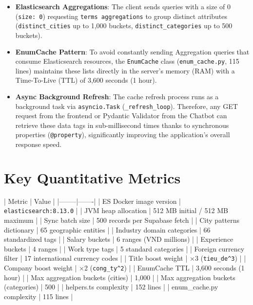 \begin{itemize}
\item \textbf{Elasticsearch Aggregations}: The client sends queries with a size of 0 (\texttt{size: 0}) requesting \texttt{terms aggregations} to group distinct attributes (\texttt{distinct\_cities} up to 1,000 buckets, \texttt{distinct\_categories} up to 500 buckets).
\item \textbf{EnumCache Pattern}: To avoid constantly sending Aggregation queries that consume Elasticsearch resources, the \texttt{EnumCache} class (\texttt{enum\_cache.py}, 115 lines) maintains these lists directly in the server's memory (RAM) with a Time-To-Live (TTL) of 3,600 seconds (1 hour).
\item \textbf{Async Background Refresh}: The cache refresh process runs as a background task via \texttt{asyncio.Task} (\texttt{\_refresh\_loop}). Therefore, any GET request from the frontend or Pydantic Validator from the Chatbot can retrieve these data tags in sub-millisecond times thanks to synchronous properties (\texttt{@property}), significantly improving the application's overall response speed.
\end{itemize}

\section{Key Quantitative Metrics}

| Metric | Value |
|--------|-------|
| ES Docker image version | \texttt{elasticsearch:8.13.0} |
| JVM heap allocation | 512 MB initial / 512 MB maximum |
| Sync batch size | 500 records per Supabase fetch |
| City patterns dictionary | 65 geographic entities |
| Industry domain categories | 66 standardized tags |
| Salary buckets | 6 ranges (VND millions) |
| Experience buckets | 4 ranges |
| Work type tags | 5 standard categories |
| Foreign currency filter | 17 international currency codes |
| Title boost weight | ×3 (\texttt{tieu\_de\textasciicircum{}3}) |
| Company boost weight | ×2 (\texttt{cong\_ty\textasciicircum{}2}) |
| EnumCache TTL | 3,600 seconds (1 hour) |
| Max aggregation buckets (cities) | 1,000 |
| Max aggregation buckets (categories) | 500 |
| helpers.ts complexity | 152 lines |
| enum\_cache.py complexity | 115 lines |
